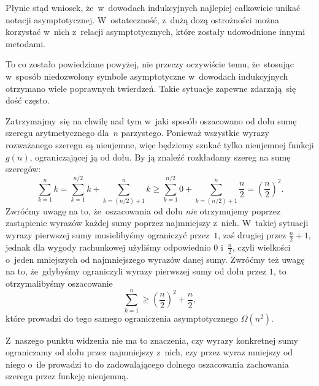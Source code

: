 \documentclass[a4paper,11pt]{article}
\begin{document}
Płynie stąd wniosek, że~w~dowodach indukcyjnych najlepiej całkowicie unikać
notacji asymptotycznej. W~ostateczność, z~dużą dozą ostrożności można
korzystać w~nich z~relacji asymptotycznych, które zostały udowodnione innymi
metodami.

To co zostało powiedziane powyżej, nie przeczy oczywiście temu, że~stosując
w~sposób niedozwolony symbole asymptotyczne w~dowodach indukcyjnych otrzymano
wiele poprawnych twierdzeń. Takie sytuacje zapewne zdarzają~się dość
często.

\vspace{\spaceFour}





\noindent
{} Zatrzymajmy~się na chwilę nad tym w~jaki sposób oszacowano od dołu
sumę szeregu arytmetycznego dla~$n$ parzystego. Ponieważ wszystkie wyrazy
rozważanego szeregu są nieujemne, więc będziemy szukać tylko nieujemnej
funkcji $g( n )$, ograniczającej ją od dołu. By ją znaleźć rozkładamy szereg
na sumę szeregów:
\begin{equation}
  \label{eq:CormenAtAl-WprowadzenieDoAlgorytmow-21}
  \sum_{ k = 1 }^{ n } k =
  \sum_{ k = 1 }^{ n / 2 } k + \sum_{ k = ( n / 2 ) + 1 }^{ n } k \geq
  \sum_{ k = 1 }^{ n / 2 } 0 + \sum_{ k = ( n / 2 ) + 1 }^{ n } \frac{ n }{ 2 } =
  \left( \frac{ n }{ 2 } \right)^{ 2 }.
\end{equation}
Zwróćmy uwagę na to, że~oszacowania od dołu \textit{nie} otrzymujemy poprzez
zastąpienie wyrazów każdej sumy poprzez najmniejszy z~nich. W~takiej
sytuacji wyrazy pierwszej sumy musielibyśmy ograniczyć przez~$1$,
zaś drugiej przez $\frac{ n }{ 2 } + 1$, jednak dla wygody rachunkowej
użyliśmy odpowiednio $0$ i~$\frac{ n }{ 2 }$, czyli wielkości o~jeden
mniejszych od najmniejszego wyrazów danej sumy. Zwróćmy też uwagę na to,
że~gdybyśmy ograniczyli wyrazy pierwszej sumy od dołu przez $1$, to
otrzymalibyśmy oszacowanie
\begin{equation}
  \label{eq:CormenAtAl-WprowadzenieDoAlgorytmow-22}
  \sum_{ k = 1 }^{ n } \geq
  \left( \frac{ n }{ 2 } \right)^{ 2 } + \frac{ n }{ 2 },
\end{equation}
które prowadzi do tego samego ograniczenia asymptotycznego $\Omega( n^{ 2 } )$.

Z~naszego punktu widzenia nie ma to znaczenia, czy wyrazy konkretnej sumy
ograniczamy od dołu przez najmniejszy z~nich, czy przez wyraz mniejszy od
niego o~ile prowadzi to do zadowalającego dolnego oszacowania zachowania szeregu przez funkcję nieujemną.
\end{document}
